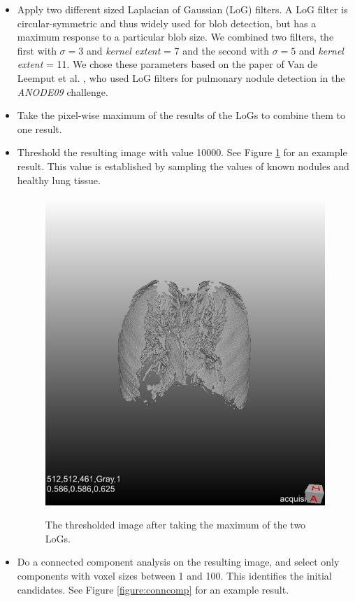 \documentclass{article}
\begin{document}
\begin{itemize}
\item Apply two different sized Laplacian of Gaussian (LoG) filters. A LoG filter is circular-symmetric and thus widely used for blob detection, but has a maximum response to a particular blob size. We combined two filters, the first with $\sigma = 3$ and \emph{kernel extent} = 7 and the second with $\sigma = 5$ and \emph{kernel extent} = 11. We chose these parameters based on the paper of Van de Leemput et al. \cite{leemput}, who used LoG filters for pulmonary nodule detection in the \emph{ANODE09} challenge.
\item Take the pixel-wise maximum of the results of the LoGs to combine them to one result.
\item Threshold the resulting image with value 10000. See Figure \ref{figure:LoGresult} for an example result. This value is established by sampling the values of known nodules and healthy lung tissue.
	\begin{figure}[h]
	\centering
	{\includegraphics[width=0.7\linewidth]{./after_LoG.jpg}}
	\caption{The thresholded image after taking the maximum of the two LoGs. \label{figure:LoGresult}}
	\end{figure}
\item Do a connected component analysis on the resulting image, and select only components with voxel sizes between 1 and 100. This identifies the initial candidates. See Figure \ref{figure:conncomp} for an example result.
	\begin{figure}[h]
	\centering

\end{figure}
\end{itemize}
\end{document}
